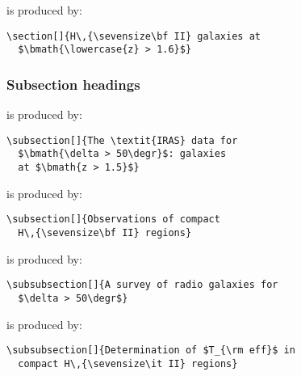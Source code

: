 \documentclass[useAMS,usenatbib]{mn2e}
\begin{document}
%
is produced by:
%
\begin{verbatim}
\section[]{H\,{\sevensize\bf II} galaxies at
  $\bmath{\lowercase{z} > 1.6}$}
\end{verbatim}


\subsubsection*{S\lowercase{ubsection headings}}

%
is produced by:
%
\begin{verbatim}
\subsection[]{The \textit{IRAS} data for
  $\bmath{\delta > 50\degr}$: galaxies
  at $\bmath{z > 1.5}$}
\end{verbatim}
\bigskip

%
is produced by:
%
\begin{verbatim}
\subsection[]{Observations of compact
  H\,{\sevensize\bf II} regions}
\end{verbatim}
\bigskip

%
is produced by:
%
\begin{verbatim}
\subsubsection[]{A survey of radio galaxies for
  $\delta > 50\degr$}
\end{verbatim}
\bigskip

%
is produced by:
%
\begin{verbatim}
\subsubsection[]{Determination of $T_{\rm eff}$ in
  compact H\,{\sevensize\it II} regions}
\end{verbatim}
\bigskip
\end{document}
